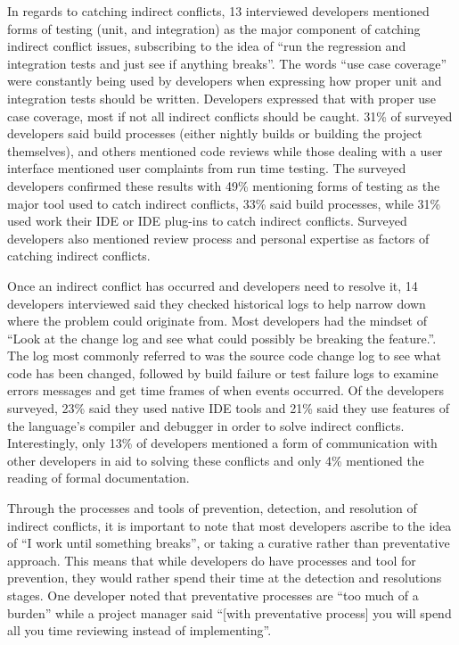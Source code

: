 \documentclass[conference]{IEEEtran}
\begin{document}
In regards to catching indirect conflicts, 13 interviewed developers mentioned forms of testing (unit, and integration) 
as the major component of catching indirect conflict issues, subscribing to the idea of ``run the regression and integration 
tests and just see if anything breaks''. The words ``use case coverage'' were constantly being used by developers
when expressing how proper unit and integration tests should be written. Developers expressed that with proper use case coverage, most if
not all indirect conflicts should be caught. 31\% of surveyed developers said build processes (either nightly builds or building the project 
themselves), and others mentioned code reviews while those dealing with a user interface mentioned user complaints from run 
time testing. The surveyed developers confirmed these results with 49\% mentioning forms of testing as the major tool used to 
catch indirect conflicts, 33\% said build processes, while 31\% used work their IDE or IDE plug-ins to catch indirect conflicts.
Surveyed developers also mentioned review process and personal expertise as factors of catching indirect conflicts.

Once an indirect conflict has occurred and developers need to resolve it, 14 developers interviewed said
they checked historical logs to help narrow down where the problem could originate from. Most developers had the mindset of
``Look at the change log and see what could possibly be breaking the feature.''. The log most commonly referred to was the source
code change log to see what code has been changed, followed by build failure or test failure logs to examine errors messages and get time 
frames of when events occurred. Of the developers surveyed, 23\% said they used native IDE tools and 21\% said they use 
features of the language's compiler and debugger in order to solve indirect conflicts. Interestingly, only 13\% of developers 
mentioned a form of communication with other developers in aid to solving these conflicts and only 4\% mentioned the reading 
of formal documentation.

Through the processes and tools of prevention, detection, and resolution of indirect conflicts, it is important to note that
most developers ascribe to the idea of ``I work until something breaks'', or taking a curative rather than preventative
approach. This means that while developers do have processes and tool for prevention, they would rather spend their time
at the detection and resolutions stages. One developer noted that preventative processes are ``too much of a burden''
while a project manager said ``[with preventative process] you will spend all you time reviewing instead of implementing''. 
\end{document}

